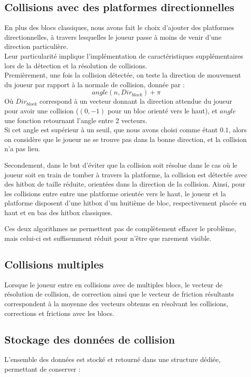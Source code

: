 \documentclass[10pt]{report}
\begin{document}
\subsection{Collisions avec des platformes directionnelles}
En plus des blocs classiques, nous avons fait le choix d'ajouter des platformes directionnelles, à travers lesquelles le joueur passe à moins de venir d'une direction particulière.\\
Leur particularité implique l'implémentation de caractéristiques supplémentaires lors de la détection et la résolution de collisions.\\
Premièrement, une fois la collision détectée, on teste la direction de mouvement du joueur par rapport à la normale de collision, donnée par :
\[
  angle(n,Dir_{block}) + \pi
\]
Où \(Dir_{block}\) correspond à un vecteur donnant la direction attendue du joueur pour avoir une collision (\((0,-1)\) pour un bloc orienté vers le haut), et \(angle\) une fonction retournant l'angle entre 2 vecteurs.\\
Si cet angle est supérieur à un seuil, que nous avons choisi comme étant \(0.1\), alors on considère que le joueur ne se trouve pas dans la bonne direction, et la collision n'a pas lieu.\par
Secondement, dans le but d'éviter que la collision soit résolue dans le cas où le joueur soit en train de tomber à travers la platforme, la collision est détectée avec des hitbox de taille réduite, orientées dans la direction de la collision. Ainsi, pour les collisions entre entre une platforme orientée vers le haut, le joueur et la platforme disposent d'une hitbox d'un huitième de bloc, respectivement placée en haut et en bas des hitbox classiques.\par
Ces deux algorithmes ne permettent pas de complètement effacer le problème, mais celui-ci est suffisemment réduit pour n'être que rarement visible.

\subsection{Collisions multiples}
Lorsque le joueur entre en collisions avec de multiples blocs, le vecteur de résolution de collision, de correction ainsi que le vecteur de friction résultants correspondent à la moyenne des vecteurs obtenus en résolvant les collisions, corrections et frictions avec les blocs.

\subsection{Stockage des données de collision}
L'ensemble des données est stocké et retourné dans une structure dédiée, permettant de conserver :
\end{document}
